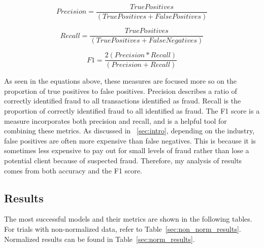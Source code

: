 \documentclass[midd]{thesis}
\begin{document}
\begin{equation}
\label{eq:precision}
    Precision = \frac{True Positives} {(True Positives + False Positives)}
\end{equation}

\begin{equation}
\label{eq:recall}
    Recall = \frac{True Positives}{ (True Positives + False Negatives)}
\end{equation}

\begin{equation}
\label{eq:F1}
    F1 = \frac{2 (Precision * Recall)} {(Precision + Recall)}
\end{equation}


As seen in the equations above, these measures are focused more so on the proportion of true positives to false positives. Precision describes a ratio of correctly identified fraud to all transactions identified as fraud. Recall is the proportion of correctly identified fraud to all identified as fraud. The F1 score is a measure incorporates both precision and recall, and is a helpful tool for combining these metrics. As discussed in ~\ref{sec:intro}, depending on the industry, false positives are often more expensive than false negatives. This is because it is sometimes less expensive to pay out for small levels of fraud rather than lose a potential client because of suspected fraud. Therefore, my analysis of results comes from both accuracy and the F1 score.



\subsection{Results}

The most successful models and their metrics are shown in the following tables. For trials with non-normalized data, refer to Table~\ref{sec:non_norm_results}. Normalized results can be found in Table~\ref{sec:norm_results}. 
\end{document}
